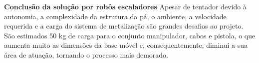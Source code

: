 

\textbf{Conclusão da solução por robôs escaladores}
Apesar de tentador devido à autonomia, a complexidade da estrutura da pá, o
ambiente, a velocidade requerida e a carga do sistema de metalização são
grandes desafios ao projeto. São estimados 50 kg de
carga para o conjunto manipulador, cabos e pistola, o que aumenta muito as
dimensões da base móvel e, consequentemente, diminui a sua área de atuação,
tornando o processo mais demorado.
